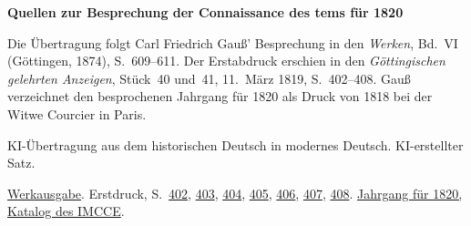\clearpage\thispagestyle{empty}
\begin{center}\Large\bfseries Quellen zur Besprechung der Connaissance des tems für 1820\end{center}

Die Übertragung folgt Carl Friedrich Gauß’ Besprechung in den \emph{Werken}, Bd.~VI (Göttingen, 1874), S.~609--611. Der Erstabdruck erschien in den \emph{Göttingischen gelehrten Anzeigen}, Stück~40 und~41, 11.~März 1819, S.~402--408. Gauß verzeichnet den besprochenen Jahrgang für 1820 als Druck von 1818 bei der Witwe Courcier in Paris.

KI-Übertragung aus dem historischen Deutsch in modernes Deutsch. KI-erstellter Satz.

\href{https://gdz.sub.uni-goettingen.de/id/PPN236007467}{Werkausgabe}. Erstdruck, S.~\href{https://images.p.sub.uni-goettingen.de/iiif/image/gdz:PPN319721507_1819:00000404/full/1650,/0/default.jpg}{402}, \href{https://images.p.sub.uni-goettingen.de/iiif/image/gdz:PPN319721507_1819:00000405/full/1650,/0/default.jpg}{403}, \href{https://images.p.sub.uni-goettingen.de/iiif/image/gdz:PPN319721507_1819:00000406/full/1650,/0/default.jpg}{404}, \href{https://images.p.sub.uni-goettingen.de/iiif/image/gdz:PPN319721507_1819:00000407/full/1650,/0/default.jpg}{405}, \href{https://images.p.sub.uni-goettingen.de/iiif/image/gdz:PPN319721507_1819:00000408/full/1650,/0/default.jpg}{406}, \href{https://images.p.sub.uni-goettingen.de/iiif/image/gdz:PPN319721507_1819:00000409/full/1650,/0/default.jpg}{407}, \href{https://images.p.sub.uni-goettingen.de/iiif/image/gdz:PPN319721507_1819:00000410/full/1650,/0/default.jpg}{408}. \href{https://cdt.imcce.fr/items/show/169}{Jahrgang für 1820, Katalog des IMCCE}.

\clearpage
